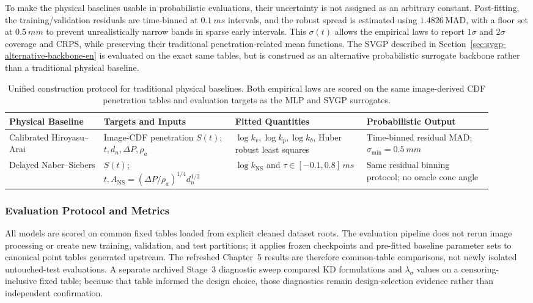 To make the physical baselines usable in probabilistic evaluations, their uncertainty is not assigned as an arbitrary constant. Post-fitting, the training/validation residuals are time-binned at $\SI{0.1}{ms}$ intervals, and the robust spread is estimated using $1.4826\,\mathrm{MAD}$, with a floor set at $\SI{0.5}{mm}$ to prevent unrealistically narrow bands in sparse early intervals. This $\sigma(t)$ allows the empirical laws to report $1\sigma$ and $2\sigma$ coverage and CRPS, while preserving their traditional penetration-related mean functions. The SVGP described in Section~\ref{sec:svgp-alternative-backbone-en} is evaluated on the exact same tables, but is construed as an alternative probabilistic surrogate backbone rather than a traditional physical baseline.

\begin{table}[H]
\centering
\footnotesize
\setlength{\tabcolsep}{3pt}
\begin{tabular}{@{}L{0.18\linewidth}L{0.25\linewidth}L{0.25\linewidth}L{0.24\linewidth}@{}}
\toprule
Physical Baseline & Targets and Inputs & Fitted Quantities & Probabilistic Output \\
\midrule
Calibrated Hiroyasu--Arai &
Image-CDF penetration \(S(t)\); \(t,d_n,\Delta P,\rho_a\) &
\(\log k_v,\log k_p,\log k_b\), Huber robust least squares &
Time-binned residual MAD; \(\sigma_{\min}=\SI{0.5}{mm}\) \\
\midrule
Delayed Naber--Siebers &
\(S(t)\); \(t,A_{\mathrm{NS}}=(\Delta P/\rho_a)^{1/4}d_n^{1/2}\) &
\(\log k_{\mathrm{NS}}\) and \(\tau\in[-0.1,0.8]\,\si{ms}\) &
Same residual binning protocol; no oracle cone angle \\
\bottomrule
\end{tabular}
\caption{Unified construction protocol for traditional physical baselines. Both empirical laws are scored on the same image-derived CDF penetration tables and evaluation targets as the MLP and SVGP surrogates.}
\label{tab:baseline-fitting-protocol-en}
\end{table}

\subsubsection{Evaluation Protocol and Metrics}
\label{sec:evaluation-protocol-en}

All models are scored on common fixed tables loaded from explicit cleaned dataset roots. The evaluation pipeline does not rerun image processing or create new training, validation, and test partitions; it applies frozen checkpoints and pre-fitted baseline parameter sets to canonical point tables generated upstream. The refreshed Chapter~5 results are therefore common-table comparisons, not newly isolated untouched-test evaluations. A separate archived Stage~3 diagnostic sweep compared KD formulations and $\lambda_\sigma$ values on a censoring-inclusive fixed table; because that table informed the design choice, those diagnostics remain design-selection evidence rather than independent confirmation.

